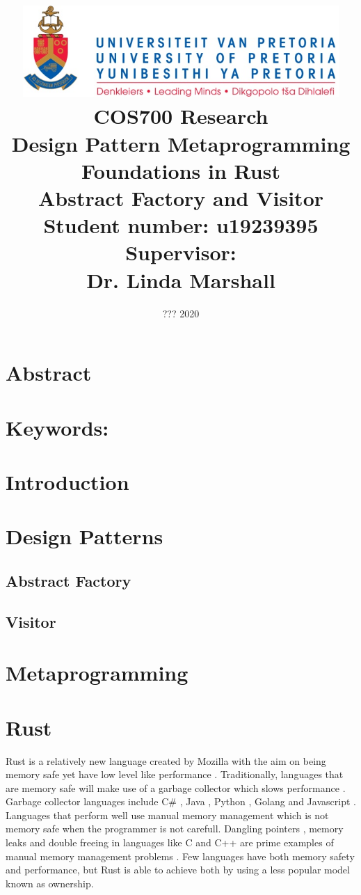 \documentclass[a4paper,10pt]{article}
\title
{
   \includegraphics[width=12cm]{up_logo.png} \\
   \vspace{2cm}
   \textbf{COS700 Research} \\ \vspace{0.5cm}
   \textbf{Design Pattern Metaprogramming Foundations in Rust\\ \large Abstract Factory and Visitor} \\ \vspace{0.5cm}
   \textbf{Student number:} u19239395 \\ \vspace{0.5cm}
   \textbf{Supervisor}: \\ Dr. Linda Marshall
}
\date{??? 2020}
\begin{document}
\author{}

\maketitle

\newpage
\linespread{1.25}

\section*{Abstract}

\section*{Keywords:}

\newpage

\section{Introduction}

\section{Design Patterns}

\subsection{Abstract Factory}

\subsection{Visitor}

\section{Metaprogramming}

\section{Rust}
Rust is a relatively new language created by Mozilla with the aim on being memory safe yet have low level like performance \cite{klabnik_2019_01}.
Traditionally, languages that are memory safe will make use of a garbage collector which slows performance \cite{hertz_05_01}.
Garbage collector languages include C\# \cite{robinson_04_01}, Java \cite{gosling_96_01}, Python \cite{martelli_06_01}, Golang \cite{tsoukalos_18_01} and Javascript \cite{flanagan_06_01}.
Languages that perform well use manual memory management which is not memory safe when the programmer is not carefull.
Dangling pointers \cite{caballero_12_01}, memory leaks \cite{wilson_92_01} and double freeing \cite{sharp_13_01} in languages like C and C++ are prime examples of manual memory management problems \cite{konrad_18_01}.
Few languages have both memory safety and performance, but Rust is able to achieve both by using a less popular model known as ownership.
\end{document}
